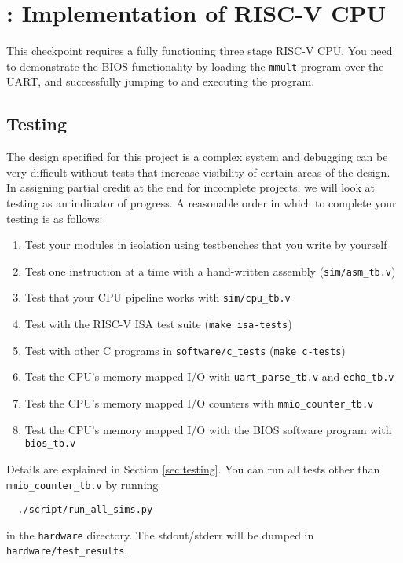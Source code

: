 \section{\baseCPUTaskName: Implementation of RISC-V CPU}

This checkpoint requires a fully functioning three stage RISC-V CPU.
You need to demonstrate the BIOS functionality by loading the \verb|mmult| program over the UART,
and successfully jumping to and executing the program.


\subsection{Testing}
\label{testing}
The design specified for this project is a complex system and debugging can be very difficult without tests that increase visibility of certain areas of the design.
In assigning partial credit at the end for incomplete projects, we will look at testing as an indicator of progress.
A reasonable order in which to complete your testing is as follows:

\begin{enumerate}
  \item Test your modules in isolation using testbenches that you write by yourself
  \item Test one instruction at a time with a hand-written assembly (\verb|sim/asm_tb.v|)
  \item Test that your CPU pipeline works with \verb|sim/cpu_tb.v|
  \item Test with the RISC-V ISA test suite (\verb|make isa-tests|)
  \item Test with other C programs in \verb|software/c_tests| (\verb|make c-tests|)
  \item Test the CPU's memory mapped I/O with \verb|uart_parse_tb.v| and \verb|echo_tb.v|
  \item Test the CPU's memory mapped I/O counters with \verb|mmio_counter_tb.v|
  \item Test the CPU's memory mapped I/O with the BIOS software program with \verb|bios_tb.v|
\end{enumerate}

Details are explained in Section \ref{sec:testing}.
You can run all tests other than \verb|mmio_counter_tb.v| by running
\begin{verbatim}
  ./script/run_all_sims.py
\end{verbatim}
in the \verb|hardware| directory.
The stdout/stderr will be dumped in \verb|hardware/test_results|.

